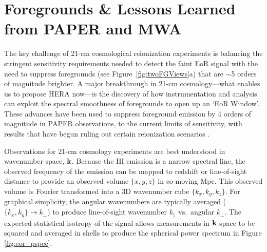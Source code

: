 \documentclass[preprint]{aastex}
\def\kperp{k_{\bot}}
\def\kpar{k_{\|}}
\def\k{{\bf k}}
\def\HI{{H{\small I }}}
\begin{document}

\vspace{-0.25in}
\section{Foregrounds \& Lessons Learned from PAPER and MWA}
\label{LessonsSec}

The key challenge of 21-cm cosmological reionization experiments is 
balancing the stringent sensitivity requirements needed to detect the faint EoR signal
with the need to suppress
foregrounds (see Figure~\ref{fig:twoFGViews}a) that are $\sim$5 orders of magnitude brighter.
A major breakthrough in 21-cm cosmology---what enables us to propose HERA now---is 
the discovery of how 
instrumentation and analysis can exploit the 
spectral smoothness of foregrounds
to open up an `EoR Window'.  
These advances have been used to suppress foreground emission by 4
orders of magnitude in PAPER observations,
to the current limits of sensitivity,
with results that have begun ruling out certain reionization scenarios
\citep{parsons_et_al2013}.

Observations for 21-cm cosmology experiments are best understood in
wavenumber space, $\k$.  Because the \HI emission is a
narrow spectral line, the observed frequency of the emission can be mapped to
redshift or line-of-sight distance to provide an observed volume $\{x,y,z\}$ in
co-moving Mpc. This observed volume is Fourier transformed into a 3D
wavenumber cube $\{k_{x}, k_{y}, k_{z}\}$. For graphical simplicity, the angular
wavenumbers are typically averaged ($\{k_{x},k_{y}\}\rightarrow\kperp$) to
produce line-of-sight wavenumber $\kpar$ vs.\ angular $\kperp$. 
The expected statistical isotropy of the signal allows measurements in $\k$-space to be
squared and averaged in shells to produce the spherical power spectrum
in Figure \ref{fig:eor_pspec}.
\end{document}
